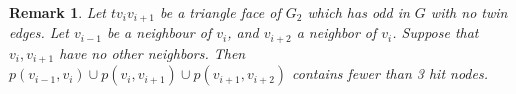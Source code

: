 \documentclass{article}
\newcommand{\0}{\mathbb{0}}
\newcommand{\1}{\mathbb{1}}
\newtheorem{remark}[theorem]{Remark}
\begin{document}
\begin{remark}\label{consecutive}
Let $ tv_iv_{i+1} $ be a triangle face of $G_2$ which has odd in $G$ with no twin edges. Let $ v_{i-1} $ be a neighbour of $v_i$, and $v_{i+2}$ a neighbor of $v_i$. Suppose that $v_i,v_{i+1}$ have no other neighbors. Then  $ p(v_{i-1} , v_i ) \cup p(v_i,v_{i+1} ) \cup p(v_{i+1},v_{i+2} ) $  contains fewer than 3 hit nodes.
\end{remark}
















\end{document}
